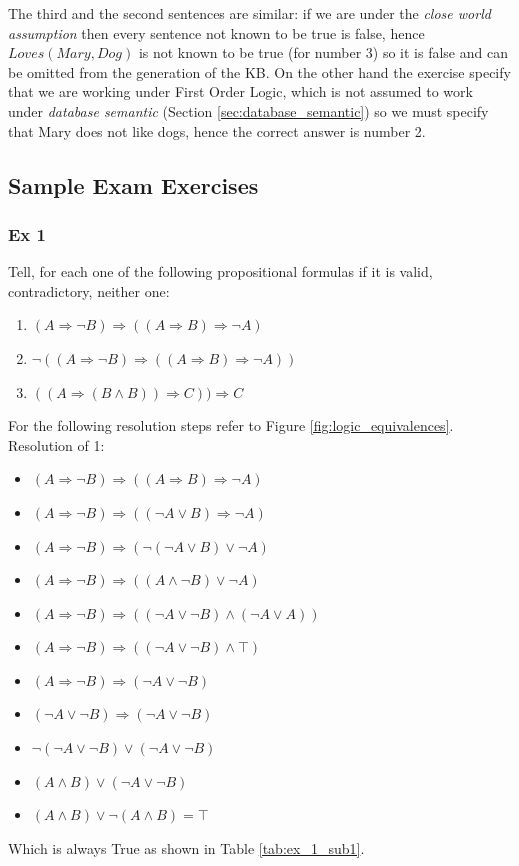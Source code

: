 \documentclass[10pt,a4paper]{article}
\begin{document}
\begin{itemize}
The third and the second sentences are similar: if we are under the \textit{close world assumption} then every sentence not known to be true is false, hence $Loves(Mary,Dog)$ is not known to be true (for number 3) so it is false and can be omitted from the generation of the KB. On the other hand the exercise specify that we are working under First Order Logic, which is not assumed to work under \textit{database semantic} (Section \ref{sec:database_semantic}) so we must specify that Mary does not like dogs, hence the correct answer is number 2.

\subsection{Sample Exam Exercises}

\subsubsection{Ex 1}
Tell, for each one of the following propositional formulas if it is valid, contradictory, neither one:
\begin{enumerate}
\item $(A\Rightarrow \neg B)\Rightarrow((A\Rightarrow B)\Rightarrow \neg A)$
\item $\neg ((A\Rightarrow \neg B)\Rightarrow ((A\Rightarrow B)\Rightarrow \neg A))$
\item $((A\Rightarrow (B\wedge B))\Rightarrow C))\Rightarrow C$
\end{enumerate}
For the following resolution steps refer to Figure \ref{fig:logic_equivalences}.\\
Resolution of 1:
\begin{itemize}
\item $(A\Rightarrow \neg B)\Rightarrow((A\Rightarrow B)\Rightarrow \neg A)$
\item $(A\Rightarrow \neg B)\Rightarrow((\neg A\vee B)\Rightarrow \neg A)$
\item $(A\Rightarrow \neg B)\Rightarrow(\neg (\neg A\vee B)\vee \neg A)$
\item $(A\Rightarrow \neg B)\Rightarrow((A \wedge \neg B)\vee \neg A)$
\item $(A\Rightarrow \neg B)\Rightarrow((\neg A \vee \neg B)\wedge (\neg A \vee A))$
\item $(A\Rightarrow \neg B)\Rightarrow((\neg A \vee \neg B)\wedge \top)$
\item $(A\Rightarrow \neg B)\Rightarrow(\neg A \vee \neg B)$
\item $(\neg A\vee \neg B)\Rightarrow(\neg A \vee \neg B)$
\item $\neg (\neg A\vee \neg B)\vee (\neg A \vee \neg B)$
\item $ ( A \wedge B) \vee (\neg A \vee \neg B)$
\item $ ( A \wedge B) \vee \neg ( A \wedge  B)=\top$
\end{itemize}
Which is always True as shown in Table \ref{tab:ex_1_sub1}.\\


\end{itemize}
\end{document}
